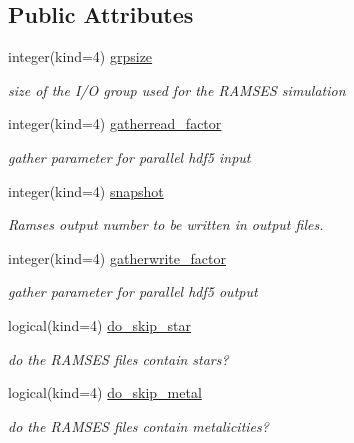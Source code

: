 \subsection*{Public Attributes}
\begin{DoxyCompactItemize}
\item 
integer(kind=4) \hyperlink{structmodconstant_1_1type__parameter__pfof__snap_a65535bf9bcf3c053b3828d83e2f40271}{grpsize}
\begin{DoxyCompactList}\small\item\em size of the I/\-O group used for the R\-A\-M\-S\-E\-S simulation \end{DoxyCompactList}\item 
integer(kind=4) \hyperlink{structmodconstant_1_1type__parameter__pfof__snap_a078d7fad865fe3a66900699ea0a786da}{gatherread\-\_\-factor}
\begin{DoxyCompactList}\small\item\em gather parameter for parallel hdf5 input \end{DoxyCompactList}\item 
integer(kind=4) \hyperlink{structmodconstant_1_1type__parameter__pfof__snap_aa9924ed26e50de32aa9bb74c85aa0d32}{snapshot}
\begin{DoxyCompactList}\small\item\em Ramses output number to be written in output files. \end{DoxyCompactList}\item 
integer(kind=4) \hyperlink{structmodconstant_1_1type__parameter__pfof__snap_afef04e15a6cc8639d9852b08b737927e}{gatherwrite\-\_\-factor}
\begin{DoxyCompactList}\small\item\em gather parameter for parallel hdf5 output \end{DoxyCompactList}\item 
logical(kind=4) \hyperlink{structmodconstant_1_1type__parameter__pfof__snap_a3d5e01fcda7d62315fe063fd879fca30}{do\-\_\-skip\-\_\-star}
\begin{DoxyCompactList}\small\item\em do the R\-A\-M\-S\-E\-S files contain stars? \end{DoxyCompactList}\item 
logical(kind=4) \hyperlink{structmodconstant_1_1type__parameter__pfof__snap_a348e60587afbd14ddb9a5f03afd4d825}{do\-\_\-skip\-\_\-metal}
\begin{DoxyCompactList}\small\item\em do the R\-A\-M\-S\-E\-S files contain metalicities? \end{DoxyCompactList}\item 

\end{DoxyCompactItemize}
